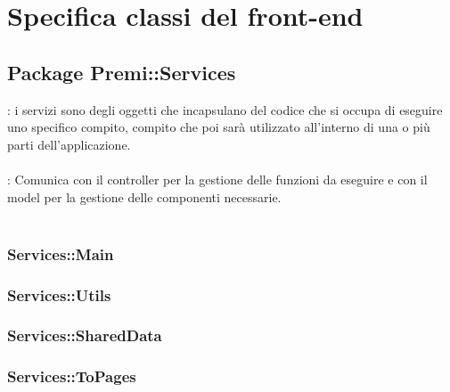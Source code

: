 \section {Specifica classi del front-end}
\subsection {Package Premi::Services}
\label{sec:services}
\textbf{\tipo}: i servizi sono degli oggetti che incapsulano del codice che si occupa di eseguire uno specifico compito, compito che poi sarà utilizzato all’interno di una o più parti dell’applicazione.\\\\
\textbf{\relaz}: Comunica con il controller per la gestione delle funzioni da eseguire e con il model per la gestione delle componenti necessarie.\\\\
\subsubsection{Services::Main}
\subsubsection{Services::Utils}
\subsubsection{Services::SharedData}
\subsubsection{Services::ToPages}


